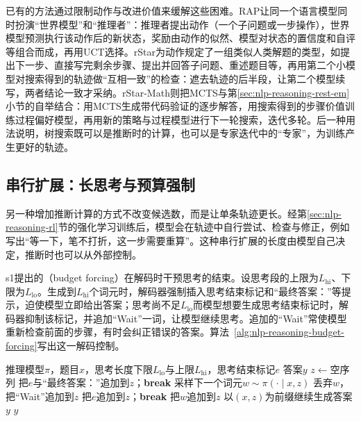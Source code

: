已有的方法通过限制动作与改进价值来缓解这些困难。RAP让同一个语言模型同时扮演“世界模型”和“推理者”：推理者提出动作（一个子问题或一步操作），世界模型预测执行该动作后的新状态，奖励由动作的似然、模型对状态的置信度和自评等组合而成，再用UCT选择。rStar为动作规定了一组类似人类解题的类型，如提出下一步、直接写完剩余步骤、提出并回答子问题、重述题目等，再用第二个小模型对搜索得到的轨迹做“互相一致”的检查：遮去轨迹的后半段，让第二个模型续写，两者结论一致才采纳。rStar-Math则把MCTS与第\ref{sec:nlp-reasoning-rest-em}小节的自举结合：用MCTS生成带代码验证的逐步解答，用搜索得到的步骤价值训练过程偏好模型，再用新的策略与过程模型进行下一轮搜索，迭代多轮。后一种用法说明，树搜索既可以是推断时的计算，也可以是专家迭代中的“专家”，为训练产生更好的轨迹。

\subsection{串行扩展：长思考与预算强制}
\label{sec:nlp-reasoning-budget-forcing}

另一种增加推断计算的方式不改变候选数，而是让单条轨迹更长。经第\ref{sec:nlp-reasoning-rl}节的强化学习训练后，模型会在轨迹中自行尝试、检查与修正，例如写出“等一下，笔不打折，这一步需要重算”。这种串行扩展的长度由模型自己决定，推断时也可以从外部控制。

s1提出的（budget forcing）在解码时干预思考的结束。设思考段的上限为$L_{\mathrm{hi}}$、下限为$L_{\mathrm{lo}}$。生成到$L_{\mathrm{hi}}$个词元时，解码器强制插入思考结束标记和“最终答案：”等提示，迫使模型立即给出答案；思考尚不足$L_{\mathrm{lo}}$而模型想要生成思考结束标记时，解码器抑制该标记，并追加“Wait”一词，让模型继续思考。追加的“Wait”常使模型重新检查前面的步骤，有时会纠正错误的答案。算法~\ref{alg:nlp-reasoning-budget-forcing}写出这一解码控制。

\begin{algorithm}[预算强制解码]
  \label{alg:nlp-reasoning-budget-forcing}
  \begin{algorithmic}[1]
    \Require 推理模型$\pi$，题目$x$，思考长度下限$L_{\mathrm{lo}}$与上限$L_{\mathrm{hi}}$，思考结束标记$e$
    \Ensure 答案$y$
    \State $z\gets$空序列
    \Loop
        \State 把$e$与“最终答案：”追加到$z$；\textbf{break} 
      \EndIf
      \State 采样下一个词元$w\sim\pi(\cdot\mid x,z)$
        \State 丢弃$w$，把“Wait”追加到$z$ 
        \State 把$e$追加到$z$；\textbf{break}
      \Else
        \State 把$w$追加到$z$
      \EndIf
    \EndLoop
    \State 以$(x,z)$为前缀继续生成答案$y$
    \State \Return $y$
  \end{algorithmic}
\end{algorithm}

